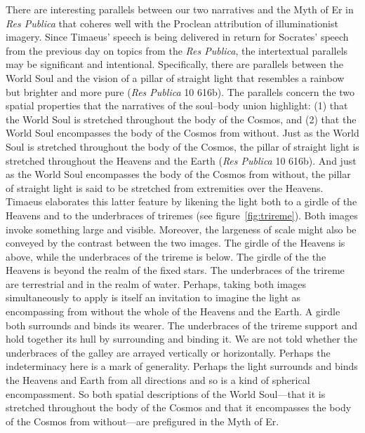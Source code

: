 There are interesting parallels between our two narratives and the Myth of Er in \emph{Res Publica} that coheres well with the Proclean attribution of illuminationist imagery. Since Timaeus' speech is being delivered in return for Socrates' speech from the previous day on topics from the \emph{Res Publica}, the intertextual parallels may be significant and intentional. Specifically, there are parallels between the World Soul and the vision of a pillar of straight light that resembles a rainbow but brighter and more pure (\emph{Res Publica} 10 616b). The parallels concern the two spatial properties that the narratives of the soul--body union highlight: (1) that the World Soul is stretched throughout the body of the Cosmos, and (2) that the World Soul encompasses the body of the Cosmos from without. Just as the World Soul is stretched throughout the body of the Cosmos, the pillar of straight light is stretched throughout the Heavens and the Earth (\emph{Res Publica} 10 616b). And just as the World Soul encompasses the body of the Cosmos from without, the pillar of straight light is said to be stretched from extremities over the Heavens. Timaeus elaborates this latter feature by likening the light both to a girdle of the Heavens and to the underbraces of triremes (see figure~\ref{fig:trireme}). Both images invoke something large and visible. Moreover, the largeness of scale might also be conveyed by the contrast between the two images. The girdle of the Heavens is above, while the underbraces of the trireme is below. The girdle of the the Heavens is beyond the realm of the fixed stars. The underbraces of the trireme are terrestrial and in the realm of water. Perhaps, taking both images simultaneously to apply is itself an invitation to imagine the light as encompassing from without the whole of the Heavens and the Earth. A girdle both surrounds and binds its wearer. The underbraces of the trireme support and hold together its hull by surrounding and binding it. We are not told whether the underbraces of the galley are arrayed vertically or horizontally. Perhaps the indeterminacy here is a mark of generality. Perhaps the light surrounds and binds the Heavens and Earth from all directions and so is a kind of spherical encompassment. So both spatial descriptions of the World Soul---that it is stretched throughout the body of the Cosmos and that it encompasses the body of the Cosmos from without---are prefigured in the Myth of Er. 

